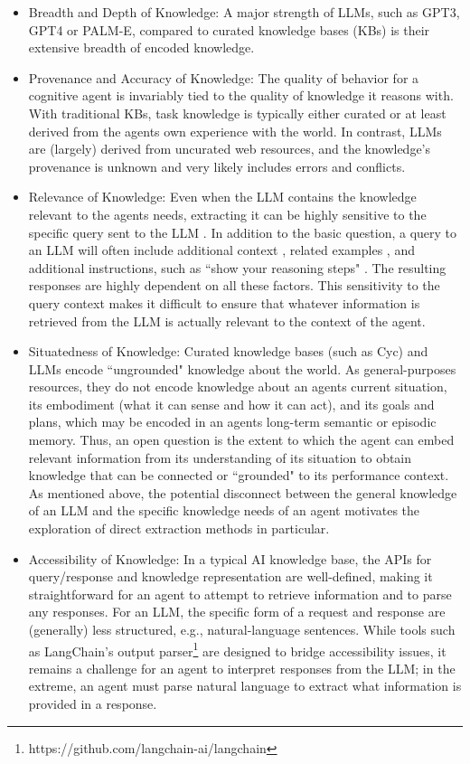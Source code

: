 \documentclass[letterpaper]{article} %
\begin{document}
\begin{itemize}
    \item Breadth and Depth of Knowledge: A major strength of LLMs, such as GPT3, GPT4 or PALM-E, compared to curated knowledge bases (KBs) is their extensive breadth of encoded knowledge.
    \item Provenance and Accuracy of Knowledge: The quality of behavior for a cognitive agent is invariably tied to the quality of knowledge it reasons with. With traditional KBs, task knowledge is typically either curated or at least derived from the agents own experience with the world. In contrast, LLMs are (largely) derived from uncurated web resources, and the knowledge's provenance is unknown and very likely includes errors and conflicts.
    \item Relevance of Knowledge: Even when the LLM contains the knowledge relevant to the agents needs, extracting it can be highly sensitive to the specific query sent to the LLM \cite{pezeshkpour_large_2023}. In addition to the basic question, a query to an LLM will often include additional context \cite{reynolds_prompt_2021}, related examples \cite{brown_language_2020}, and additional instructions, such as ``show your reasoning steps" \cite{wang_self-consistency_2023}. The resulting responses are highly dependent on all these factors. This sensitivity to the query context makes it difficult to ensure that whatever information is retrieved from the LLM is actually relevant to the context of the agent.
    \item Situatedness of Knowledge: Curated knowledge bases (such as Cyc) and LLMs encode ``ungrounded" knowledge about the world. As general-purposes resources, they do not encode knowledge about an agents current situation, its embodiment (what it can sense and how it can act), and its goals and plans, which may be encoded in an agents long-term semantic or episodic memory. Thus, an open question is the extent to which the agent can embed relevant information from its understanding of its situation to obtain knowledge that can be connected or ``grounded" to its performance context. As mentioned above, the potential disconnect between the general knowledge of an LLM and the specific knowledge needs of an agent motivates the exploration of direct extraction methods in particular.
    \item Accessibility of Knowledge: In a typical AI knowledge base, the APIs for query/response and knowledge representation are well-defined, making it straightforward for an agent to attempt to retrieve information and to parse any responses. For an LLM, the specific form of a request and response are (generally) less structured, e.g., natural-language sentences. While tools such as LangChain's output parser\footnote{https://github.com/langchain-ai/langchain} are designed to bridge accessibility issues, it remains a challenge for an agent to interpret responses from the LLM; in the extreme, an agent must parse natural language to extract what information is provided in a response.

\end{itemize}
\end{document}

